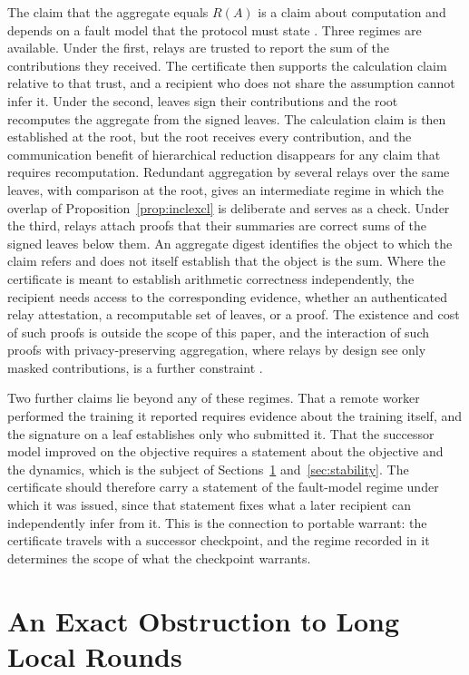 \documentclass[11pt]{article}
\theoremstyle{definition}
\theoremstyle{remark}
\begin{document}
The claim that the aggregate equals $R(A)$ is a claim about computation and depends on a fault model that the protocol must state \cite{lamport1982,castro1999}. Three regimes are available. Under the first, relays are trusted to report the sum of the contributions they received. The certificate then supports the calculation claim relative to that trust, and a recipient who does not share the assumption cannot infer it. Under the second, leaves sign their contributions and the root recomputes the aggregate from the signed leaves. The calculation claim is then established at the root, but the root receives every contribution, and the communication benefit of hierarchical reduction disappears for any claim that requires recomputation. Redundant aggregation by several relays over the same leaves, with comparison at the root, gives an intermediate regime in which the overlap of Proposition~\ref{prop:inclexcl} is deliberate and serves as a check. Under the third, relays attach proofs that their summaries are correct sums of the signed leaves below them. An aggregate digest identifies the object to which the claim refers and does not itself establish that the object is the sum. Where the certificate is meant to establish arithmetic correctness independently, the recipient needs access to the corresponding evidence, whether an authenticated relay attestation, a recomputable set of leaves, or a proof. The existence and cost of such proofs is outside the scope of this paper, and the interaction of such proofs with privacy-preserving aggregation, where relays by design see only masked contributions, is a further constraint \cite{bonawitz2017}.

Two further claims lie beyond any of these regimes. That a remote worker performed the training it reported requires evidence about the training itself, and the signature on a leaf establishes only who submitted it. That the successor model improved on the objective requires a statement about the objective and the dynamics, which is the subject of Sections~\ref{sec:obstruction} and~\ref{sec:stability}. The certificate should therefore carry a statement of the fault-model regime under which it was issued, since that statement fixes what a later recipient can independently infer from it. This is the connection to portable warrant: the certificate travels with a successor checkpoint, and the regime recorded in it determines the scope of what the checkpoint warrants.

\section{An Exact Obstruction to Long Local Rounds}\label{sec:obstruction}
\end{document}
